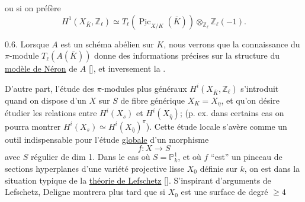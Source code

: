 
ou si on préfère
\[
 H^1(X_{\bar K},\mathbb Z_\ell)\simeq T_\ell(\underline{\operatorname{Pic}}_{X/K}(\bar K))\otimes_{\mathbb Z_\ell}\mathbb Z_\ell(-1).
\]

0.6. Lorsque $A$ est un schéma abélien sur $K$, nous verrons que la connaissance du $\pi$-module $T_\ell(A(\bar K))$ donne des informations  précises sur la structure du \uline{modèle de Néron} de $A$ [\quad], et inversement la .

D'autre part, l'étude des $\pi$-modules plus généraux $H^i(X_{\bar K},\mathbb Z_\ell)$ s'introduit quand on  dispose d'un   $X$  sur $S$ de fibre générique $X_K=X_\eta$, et qu'on désire étudier les relations entre  $H^i(X_s)$ et $H^i(X_{\bar\eta})$; (p. ex. dans certains cas on pourra montrer $H^i(X_s)\simeq H^i(X_{\bar\eta})^\pi$). Cette  étude locale s'avère comme un outil indispensable pour l'étude  \uline{globale} d'un morphisme
\[
 f:X\longrightarrow S
\]
avec $S$ régulier de dim 1.  Dans le cas où $S=\mathbb P^1_k$, et où $f$ ``est''  un pinceau  de sections hyperplanes d'une variété projective lisse $X_0$ définie sur $k$, on est dans la situation typique de la \uline{théorie de Lefschetz} [\quad]. S'inspirant d'arguments de Lefschetz, Deligne montrera plus tard que si $X_0$ est une surface de degré $\geq4$
